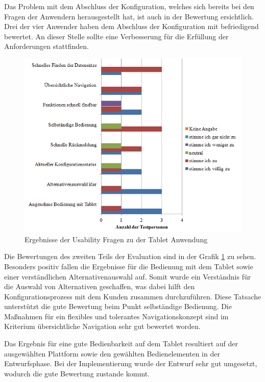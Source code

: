 Das Problem mit dem Abschluss der Konfiguration, welches sich bereits bei den Fragen der Anwendern herausgestellt hat, ist auch in der Bewertung ersichtlich. Drei der vier Anwender haben dem Abschluss der Konfiguration mit befriedigend bewertet. An dieser Stelle sollte eine Verbesserung für die Erfüllung der Anforderungen stattfinden. \par 
\begin{figure}[H]
\centering
\includegraphics{images/bewertung_tabletComplete}
\caption{Ergebnisse der Usability Fragen zu der Tablet Anwendung}
\label{bewertungUx}
\end{figure}
Die Bewertungen des zweiten Teils der Evaluation sind in der Grafik \ref{bewertungUx} zu sehen. Besonders positiv fallen die Ergebnisse für die Bedienung mit dem Tablet sowie einer verständlichen Alternativenauswahl auf. Somit wurde ein Verständnis für die Auswahl von Alternativen geschaffen, was dabei hilft den Konfigurationsprozess mit dem Kunden zusammen durchzuführen. Diese Tatsache unterstützt die gute Bewertung beim Punkt selbständige Bedienung. Die Maßnahmen für ein flexibles und tolerantes Navigationskonzept sind im Kriterium übersichtliche Navigation sehr gut bewertet worden.

Das Ergebnis für eine gute Bedienbarkeit auf dem Tablet resultiert auf der ausgewählten Plattform sowie den gewählten Bedienelementen in der Entwurfsphase. Bei der Implementierung wurde der Entwurf sehr gut umgesetzt, wodurch die gute Bewertung zustande kommt. \par 

